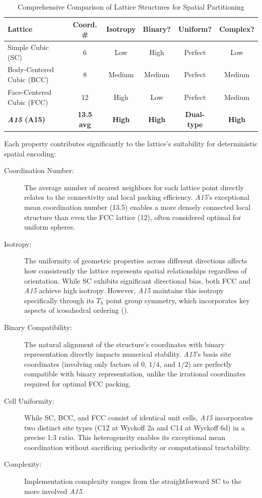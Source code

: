 \documentclass[10pt]{article}
\def\AAAB{\textit{A15}}
\begin{document}
\begin{table}[!ht]
\centering
\caption{Comprehensive Comparison of Lattice Structures for Spatial Partitioning}
\label{tab-lattice-comparison}
\begin{tabular}{lccccc}
\toprule
\textbf{Lattice} & \textbf{Coord. \#} & \textbf{Isotropy} & \textbf{Binary?} & \textbf{Uniform?} & \textbf{Complex?} \\
\midrule
Simple Cubic (SC) & 6 & Low & High & Perfect & Low \\
Body-Centered Cubic (BCC) & 8 & Medium & Medium & Perfect & Medium \\
Face-Centered Cubic (FCC) & 12 & High & Low & Perfect & Medium \\
\textbf{\AAAB{} (A15)} & \textbf{13.5 avg} & \textbf{High} & \textbf{High} & \textbf{Dual-type} & \textbf{High} \\
\bottomrule
\end{tabular}
\end{table}

Each property contributes significantly to the lattice's suitability for deterministic spatial encoding:

\begin{description}
    \item[Coordination Number:] The average number of nearest neighbors for each lattice point directly relates to the connectivity and local packing efficiency. \AAAB{}'s exceptional mean coordination number (13.5) enables a more densely connected local structure than even the FCC lattice (12), often considered optimal for uniform spheres.

    \item[Isotropy:] The uniformity of geometric properties across different directions affects how consistently the lattice represents spatial relationships regardless of orientation. While SC exhibits significant directional bias, both FCC and \AAAB{} achieve high isotropy. However, \AAAB{} maintains this isotropy specifically through its $T_h$ point group symmetry, which incorporates key aspects of icosahedral ordering ().

    \item[Binary Compatibility:] The natural alignment of the structure's coordinates with binary representation directly impacts numerical stability. \AAAB{}'s basis site coordinates (involving only factors of $0$, $1/4$, and $1/2$) are perfectly compatible with binary representation, unlike the irrational coordinates required for optimal FCC packing.

    \item[Cell Uniformity:] While SC, BCC, and FCC consist of identical unit cells, \AAAB{} incorporates two distinct site types (C12 at Wyckoff 2a and C14 at Wyckoff 6d) in a precise 1:3 ratio. This heterogeneity enables its exceptional mean coordination without sacrificing periodicity or computational tractability.

    \item[Complexity:] Implementation complexity ranges from the straightforward SC to the more involved \AAAB{}.
\end{description}
\end{document}
